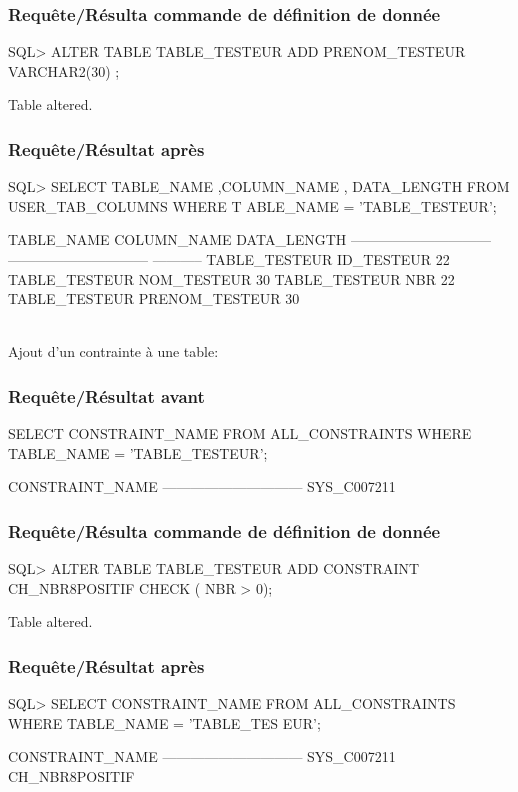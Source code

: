 \documentclass[•]{article}
\begin{document}
\subsubsection{Requête/Résulta commande de définition de donnée}
\begin{sql}
 SQL>  ALTER TABLE TABLE_TESTEUR ADD PRENOM_TESTEUR VARCHAR2(30) ;

Table altered.
\end{sql}
\subsubsection{Requête/Résultat après}
\begin{sql}
SQL>  SELECT TABLE_NAME ,COLUMN_NAME , DATA_LENGTH FROM USER_TAB_COLUMNS WHERE T
ABLE_NAME = 'TABLE_TESTEUR';

TABLE_NAME                     COLUMN_NAME                    DATA_LENGTH
------------------------------ ------------------------------ -----------
TABLE_TESTEUR                  ID_TESTEUR                              22
TABLE_TESTEUR                  NOM_TESTEUR                             30
TABLE_TESTEUR                  NBR                                     22
TABLE_TESTEUR                  PRENOM_TESTEUR                          30
 
\end{sql}

\textrm{ }
\\
\textrm{Ajout d'un contrainte à une table:}
\subsubsection{Requête/Résultat avant}
\begin{sql}
 SELECT CONSTRAINT_NAME FROM ALL_CONSTRAINTS WHERE TABLE_NAME = 'TABLE_TESTEUR';
 
 
 CONSTRAINT_NAME
------------------------------
SYS_C007211
\end{sql}
\subsubsection{Requête/Résulta commande de définition de donnée}
\begin{sql}

SQL>  ALTER TABLE TABLE_TESTEUR ADD CONSTRAINT CH_NBR8POSITIF CHECK ( NBR > 0);

Table altered.
\end{sql}
\subsubsection{Requête/Résultat après}
\begin{sql}
SQL>  SELECT CONSTRAINT_NAME FROM ALL_CONSTRAINTS WHERE TABLE_NAME = 'TABLE_TES
EUR';

CONSTRAINT_NAME
------------------------------
SYS_C007211
CH_NBR8POSITIF
\end{sql}
\end{document}
